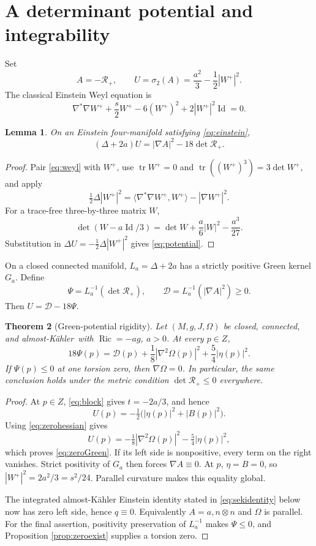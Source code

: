 \documentclass[11pt,a4paper]{article}
\newtheorem{theorem}{Theorem}[section]
\newtheorem{lemma}[theorem]{Lemma}
\theoremstyle{definition}
\theoremstyle{remark}
\newcommand{\Ric}{\operatorname{Ric}}
\newcommand{\tr}{\operatorname{tr}}
\newcommand{\Id}{\operatorname{Id}}
\newcommand{\cD}{\mathcal D}
\newcommand{\cR}{\mathcal R}
\newcommand{\AK}{almost-K\"ahler}
\begin{document}
\section{A determinant potential and integrability}
Set
\begin{equation}\label{eq:U}
 A=-\cR_+,
 \qquad U=\sigma_2(A)=\frac{a^2}{3}-\frac12|W^+|^2.
\end{equation}
The classical Einstein Weyl equation \cite{Derdzinski} is
\begin{equation}\label{eq:weyl}
 \nabla^*\nabla W^++\frac s2W^+-6(W^+)^2+2|W^+|^2\Id=0.
\end{equation}
\begin{lemma}\label{lem:scalarpotential}
On an Einstein four-manifold satisfying \eqref{eq:einstein},
\begin{equation}\label{eq:potential}
 (\Delta+2a)U=|\nabla A|^2-18\det\cR_+.
\end{equation}
\end{lemma}
\begin{proof}
Pair \eqref{eq:weyl} with $W^+$, use $\tr W^+=0$ and $\tr((W^+)^3)=3\det W^+$, and apply
\[
 \tfrac12\Delta|W^+|^2=\langle\nabla^*\nabla W^+,W^+\rangle-|\nabla W^+|^2.
\]
For a trace-free three-by-three matrix $W$,
\[
 \det(W-a\Id/3)=\det W+\frac a6|W|^2-\frac{a^3}{27}.
\]
Substitution in $\Delta U=-\tfrac12\Delta|W^+|^2$ gives \eqref{eq:potential}.
\end{proof}
On a closed connected manifold, $L_a=\Delta+2a$ has a strictly positive Green kernel $G_a$. Define
\[
 \Psi=L_a^{-1}(\det\cR_+),\qquad
 \cD=L_a^{-1}(|\nabla A|^2)\ge0.
\]
Then $U=\cD-18\Psi$.

\begin{theorem}[Green-potential rigidity]\label{thm:green}
Let $(M,g,J,\Omega)$ be closed, connected, and \AK\ with $\Ric=-ag$, $a>0$. At every $p\in Z$,
\begin{equation}\label{eq:zeroGreen}
 18\Psi(p)=\cD(p)+\frac18|\nabla^2\Omega(p)|^2+\frac54|\eta(p)|^2.
\end{equation}
If $\Psi(p)\le0$ at one torsion zero, then $\nabla\Omega=0$. In particular, the same conclusion holds under the metric condition $\det\cR_+\le0$ everywhere.
\end{theorem}
\begin{proof}
At $p\in Z$, \eqref{eq:block} gives $t=-2a/3$, and hence
\[
 U(p)=-\tfrac12\bigl(|\eta(p)|^2+|B(p)|^2\bigr).
\]
Using \eqref{eq:zerohessian} gives
\[
 U(p)=-\tfrac18|\nabla^2\Omega(p)|^2-\tfrac54|\eta(p)|^2,
\]
which proves \eqref{eq:zeroGreen}. If its left side is nonpositive, every term on the right vanishes. Strict positivity of $G_a$ then forces $\nabla A\equiv0$. At $p$, $\eta=B=0$, so $|W^+|^2=2a^2/3=s^2/24$. Parallel curvature makes this equality global.

The integrated almost-K\"ahler Einstein identity stated in \eqref{eq:sekidentity} below now has zero left side, hence $q\equiv0$. Equivalently $A=a,n\otimes n$ and $\Omega$ is parallel. For the final assertion, positivity preservation of $L_a^{-1}$ makes $\Psi\le0$, and Proposition \ref{prop:zeroexist} supplies a torsion zero.
\end{proof}
\end{document}
